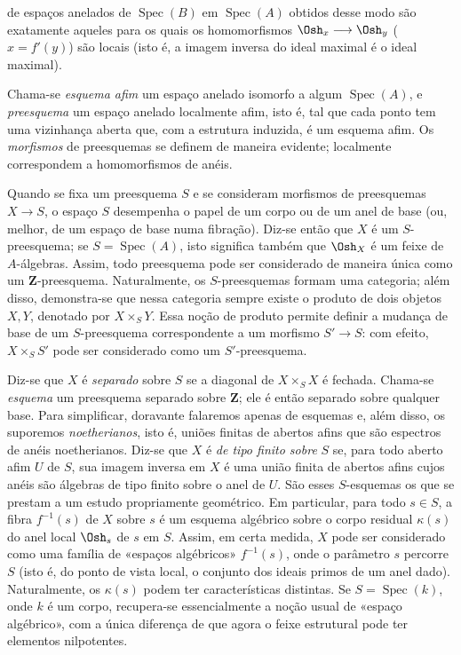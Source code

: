 de espaços anelados de $\operatorname{Spec}(B)$ em
$\operatorname{Spec}(A)$ obtidos desse modo são exatamente aqueles para
os quais os homomorfismos $\Osh_x\longrightarrow\Osh_y$ ($x=f'(y)$) são
locais (isto é, a imagem inversa do ideal maximal é o ideal maximal).

Chama-se \emph{esquema afim} um espaço anelado isomorfo a algum
$\operatorname{Spec}(A)$, e \emph{preesquema} um espaço anelado localmente
afim, isto é, tal que cada ponto tem uma vizinhança aberta que, com a
estrutura induzida, é um esquema afim. Os \emph{morfismos} de preesquemas se
definem de maneira evidente; localmente correspondem a homomorfismos de anéis.

Quando se fixa um preesquema $S$ e se consideram morfismos de preesquemas
$X\longrightarrow S$, o espaço $S$ desempenha o papel de um corpo ou de um
anel de base (ou, melhor, de um espaço de base numa fibração). Diz-se
então que $X$ é um $S$-preesquema; se $S=\operatorname{Spec}(A)$, isto
significa também que $\Osh_X$ é um feixe de $A$-álgebras. Assim, todo preesquema
pode ser considerado de maneira única como um $\mathbf Z$-preesquema. Naturalmente,
os $S$-preesquemas formam uma categoria; além disso, demonstra-se que nessa
categoria sempre existe o produto de dois objetos $X,Y$, denotado por
$X\times_S Y$. Essa noção de produto permite definir a mudança de base de um
$S$-preesquema correspondente a um morfismo $S'\longrightarrow S$: com efeito,
$X\times_S S'$ pode ser considerado como um $S'$-preesquema.

Diz-se que $X$ é \emph{separado} sobre $S$ se a diagonal de
$X\times_S X$ é fechada. Chama-se \emph{esquema} um preesquema separado
sobre $\mathbf Z$; ele é então separado sobre qualquer base. Para simplificar,
doravante falaremos apenas de esquemas e, além disso, os suporemos
\emph{noetherianos}, isto é, uniões finitas de abertos afins que são
espectros de anéis noetherianos. Diz-se que $X$ é \emph{de tipo finito
sobre} $S$ se, para todo aberto afim $U$ de $S$, sua imagem inversa em $X$ é
uma união finita de abertos afins cujos anéis são álgebras de tipo finito
sobre o anel de $U$. São esses $S$-esquemas os que se prestam a um estudo
propriamente geométrico. Em particular, para todo $s\in S$, a fibra
$f^{-1}(s)$ de $X$ sobre $s$ é um esquema algébrico sobre o corpo residual
$\kappa(s)$ do anel local $\Osh_s$ de $s$ em $S$. Assim, em certa medida, $X$
pode ser considerado como uma família de «espaços algébricos» $f^{-1}(s)$, onde
o parâmetro $s$ percorre $S$ (isto é, do ponto de vista local, o
conjunto dos ideais primos de um anel dado). Naturalmente, os
$\kappa(s)$ podem ter características distintas. Se
$S=\operatorname{Spec}(k)$, onde $k$ é um corpo, recupera-se essencialmente a
noção usual de «espaço algébrico», com a única diferença de que agora o
feixe estrutural pode ter elementos nilpotentes.

